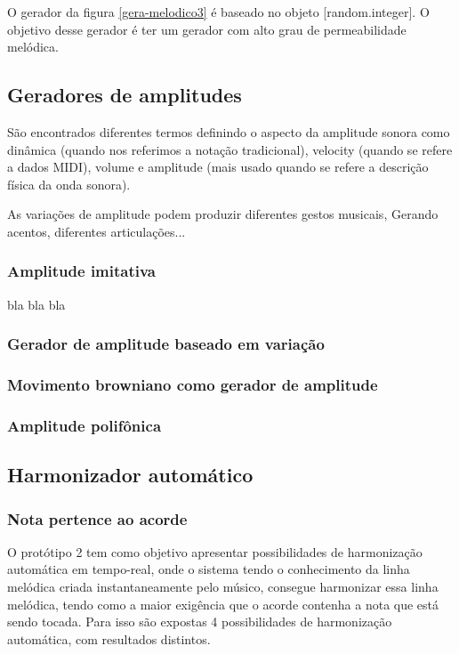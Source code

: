 \documentclass{ppgmus}
\begin{document}
O gerador da figura \ref{gera-melodico3} é baseado no 
objeto [random.integer]. O objetivo desse gerador é 
ter um gerador com alto grau de permeabilidade melódica.

\subsection{Geradores de amplitudes}

São encontrados diferentes termos definindo o aspecto
da amplitude sonora como dinâmica (quando nos referimos a notação tradicional),
velocity (quando se refere a dados MIDI), volume e amplitude (mais
usado quando se refere a descrição física da onda sonora).


As variações de amplitude podem produzir diferentes gestos musicais,
Gerando acentos, diferentes articulações...


\subsubsection{Amplitude imitativa}

bla bla bla

\subsubsection{Gerador de amplitude baseado em variação}

\subsubsection{Movimento browniano como gerador de amplitude}

\subsubsection{Amplitude polifônica}


\subsection{Harmonizador automático}

\subsubsection{Nota pertence ao acorde}


O protótipo 2 tem como objetivo apresentar possibilidades de harmonização automática em tempo-real,
onde o sistema tendo o conhecimento da linha melódica criada instantaneamente pelo músico, consegue
harmonizar essa linha melódica, tendo como a maior exigência que o acorde contenha a nota que está sendo
tocada. Para isso são expostas 4 possibilidades de harmonização automática, com resultados distintos.
\end{document}

